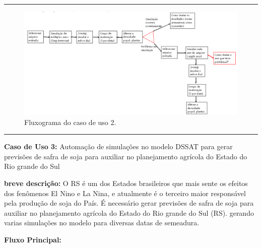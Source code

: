 \documentclass[tg]{mdtufsm}
\begin{document}
	\bigskip \hrule \bigskip
	
	\begin{figure}[!htb]
		{\centering
		\includegraphics[width=1.0\textwidth]{SoysimFlux}
		\caption{Fluxograma do caso de uso 2.}
		\label{fig:SoysimFlux}}
	\end{figure}	

	\bigskip \hrule \bigskip

	
	{\bf Caso de Uso 3:} Automação de simulações no modelo DSSAT para gerar previsões de safra de soja para auxiliar no planejamento agrícola do Estado do Rio grande do Sul
	\bigskip
	
	{\bf breve descrição:} O RS é um dos Estados brasileiros que mais sente os efeitos dos fenômenos El Nino e La Nina, e atualmente é o terceiro maior responsável pela produção de soja do País. É necessário gerar previsões de safra de soja para auxiliar no planejamento agrícola do Estado do Rio grande do Sul (RS). gerando varias simulações no modelo para diversas datas de semeadura.
	\bigskip
	
	{\bf Fluxo Principal:}
	
\end{document}
